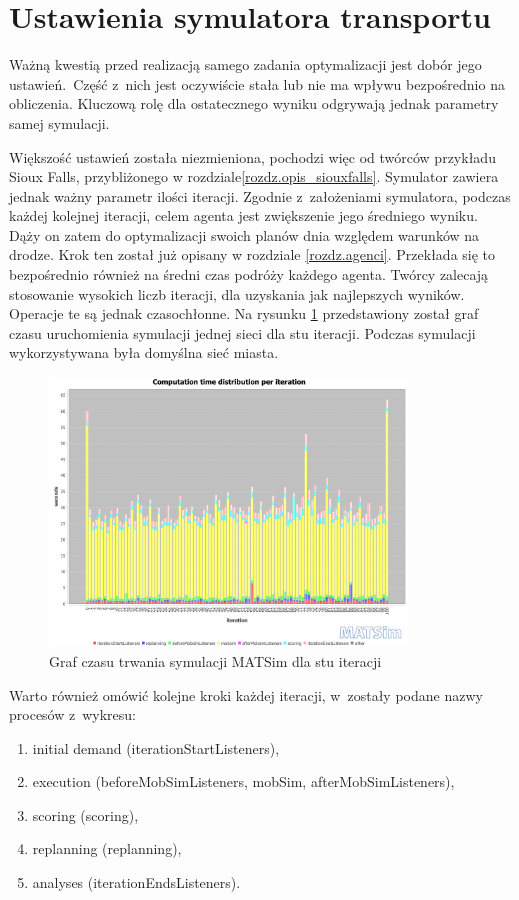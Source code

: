 \documentclass[twoside,12pt]{report}
\begin{document}
\section{Ustawienia symulatora transportu}\label{rozdz.ustawienia_symulatora}

Ważną kwestią przed realizacją samego zadania optymalizacji jest dobór jego ustawień.~Część z~nich jest oczywiście stała lub nie ma wpływu bezpośrednio na obliczenia. Kluczową rolę dla ostatecznego wyniku odgrywają jednak parametry samej symulacji.

Większość ustawień została niezmieniona, pochodzi więc od twórców przykładu Sioux Falls, przybliżonego w rozdziale\ref{rozdz.opis_siouxfalls}. Symulator zawiera jednak ważny parametr ilości iteracji. Zgodnie z~założeniami symulatora, podczas każdej kolejnej iteracji, celem agenta jest zwiększenie jego średniego wyniku. Dąży on zatem do optymalizacji swoich planów dnia względem warunków na drodze. Krok ten został już opisany w rozdziale \ref{rozdz.agenci}. Przekłada się to bezpośrednio również na średni czas podróży każdego agenta. Twórcy zalecają stosowanie wysokich liczb iteracji, dla uzyskania jak najlepszych wyników. Operacje te są jednak czasochłonne. Na rysunku \ref{fig:symulacja_czas} przedstawiony został graf czasu uruchomienia symulacji jednej sieci dla stu iteracji. Podczas symulacji wykorzystywana była domyślna sieć miasta.

\begin{figure}[ht]
\centering
\includegraphics[width=0.85\textwidth]{img/def_stopwatch}
\caption{Graf czasu trwania symulacji MATSim dla stu iteracji}
\label{fig:symulacja_czas}
\end{figure}

Warto również omówić kolejne kroki każdej iteracji, w~zostały podane nazwy procesów z~wykresu:
\begin{enumerate}
\item initial demand (iterationStartListeners),
\item execution (beforeMobSimListeners, mobSim, afterMobSimListeners), 
\item scoring (scoring),
\item replanning (replanning),
\item analyses (iterationEndsListeners).
\end{enumerate}
\end{document}
